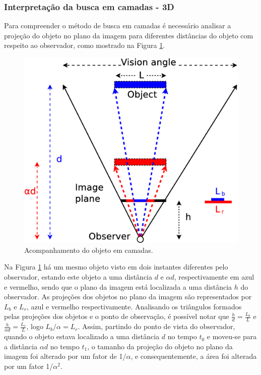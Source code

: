 

\subsubsection{Interpretação da busca em camadas - 3D}

Para compreender o método de busca em camadas é necessário analisar a projeção do objeto 
no plano da imagem para diferentes distâncias do objeto com respeito ao observador, 
como mostrado na Figura \ref{fig:multiscale3d}.
\begin{figure}[H]
\centering
  \includegraphics[width=.7\columnwidth]{images/Diagrama3.eps}
  \caption{ Acompanhamento do objeto em camadas.}
  \label{fig:multiscale3d}
\end{figure}
Na Figura \ref{fig:multiscale3d} há um mesmo objeto visto em dois instantes diferentes pelo observador,
estando este objeto a uma distância $d$ e $\alpha d$, respectivamente em azul e vermelho, sendo que
o plano da imagem está localizada a uma distância $h$ do observador. As projeções dos objetos no plano da imagem
 são representados por $L_b$ e $L_r$, azul e vermelho respectivamente. 
 Analisando os triângulos formados pelas projeções dos objetos e o ponto de observação, 
 é possível notar que $\frac{h}{d}=\frac{L_b}{L}$ e $\frac{h}{\alpha d}=\frac{L_r}{L}$, logo 
$L_b/\alpha= L_r$. 
Assim, partindo do ponto de vista do observador, quando o objeto estava localizado a uma distância $d$ no tempo
$t_0$ e moveu-se para a distância $\alpha d$ no tempo $t_1$, o tamanho da projeção do objeto no plano da imagem 
foi alterado por um fator de 1/$\alpha$, e consequentemente, a área foi alterada por um fator 1/$\alpha^2$.

